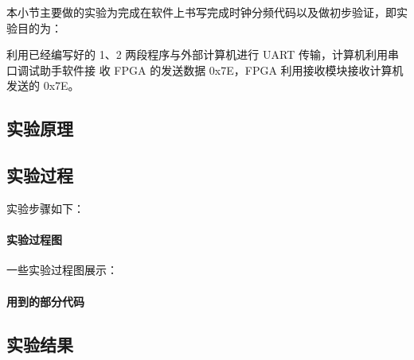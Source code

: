 

本小节主要做的实验为完成在软件上书写完成时钟分频代码以及做初步验证，即实验目的为：

利用已经编写好的 1、2 两段程序与外部计算机进行 UART 传输，计算机利用串口调试助手软件接
收 FPGA 的发送数据 0x7E，FPGA 利用接收模块接收计算机发送的 0x7E。

\subsection{实验原理}

\subsection{实验过程}
实验步骤如下：


\paragraph{实验过程图}
一些实验过程图展示：




\paragraph{用到的部分代码}



\subsection{实验结果}
